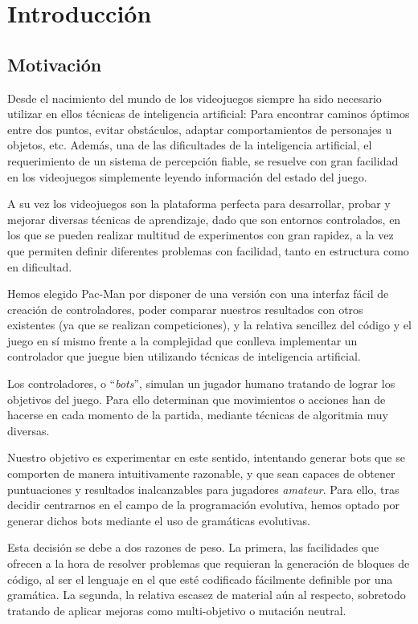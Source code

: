 \chapter{Introducción}

\section{Motivación}
Desde el nacimiento del mundo de los videojuegos siempre ha sido necesario utilizar en ellos técnicas de inteligencia artificial: Para encontrar caminos óptimos entre dos puntos, evitar obstáculos, adaptar comportamientos de personajes u objetos, etc. Además, una de las dificultades de la inteligencia artificial, el requerimiento de un sistema de percepción fiable, se resuelve con gran facilidad en los videojuegos simplemente leyendo información del estado del juego.

A su vez los videojuegos son la plataforma perfecta para desarrollar, probar y mejorar diversas técnicas de aprendizaje, dado que son entornos controlados, en los que se pueden realizar multitud de experimentos con gran rapidez, a la vez que permiten definir diferentes problemas con facilidad, tanto en estructura como en dificultad. 
 
Hemos elegido Pac-Man por disponer de una versión con una interfaz fácil de creación de controladores, poder comparar nuestros resultados con otros existentes (ya que se realizan competiciones), y la relativa sencillez del código y el juego en sí mismo frente a la complejidad que conlleva implementar un controlador que juegue bien utilizando técnicas de inteligencia artificial.
 
Los controladores, o ``\textit{bots}'', simulan un jugador humano tratando de lograr los objetivos del juego. Para ello determinan que movimientos o acciones han de hacerse en cada momento de la partida, mediante técnicas de algoritmia muy diversas.
 
Nuestro objetivo es experimentar en este sentido, intentando generar bots que se comporten de manera  intuitivamente razonable,  y que sean capaces de obtener puntuaciones y resultados inalcanzables para jugadores \textit{amateur}. Para ello, tras decidir centrarnos en el campo de la programación evolutiva, hemos optado por generar dichos bots mediante el uso de gramáticas evolutivas.

Esta decisión se debe a dos razones de peso. La primera, las facilidades que ofrecen a la hora de resolver problemas que requieran la generación de bloques de código, al ser el lenguaje en el que esté codificado fácilmente definible por una gramática. La segunda, la relativa escasez de material aún al respecto, sobretodo tratando de aplicar mejoras como multi-objetivo o mutación neutral.

